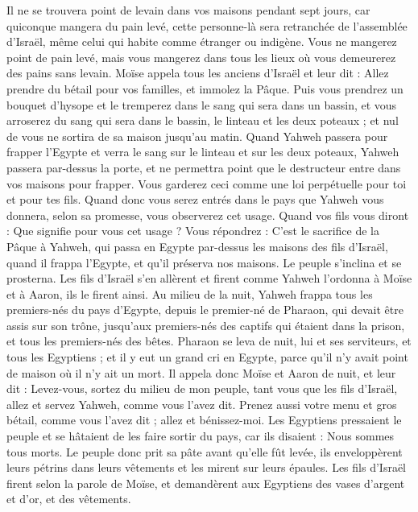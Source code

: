 \begin{multicols}{2}
Il ne se trouvera point de levain dans vos maisons pendant sept jours, car quiconque mangera du pain levé, cette personne-là sera retranchée de l’assemblée d'Israël, même celui qui habite comme étranger ou indigène.
Vous ne mangerez point de pain levé, mais vous mangerez dans tous les lieux où vous demeurerez des pains sans levain.
Moïse appela tous les anciens d'Israël et leur dit : Allez prendre du bétail pour vos familles, et immolez la Pâque.
Puis vous prendrez un bouquet d'hysope et le tremperez dans le sang qui sera dans un bassin, et vous arroserez du sang qui sera dans le bassin, le linteau et les deux poteaux ; et nul de vous ne sortira de sa maison jusqu'au matin.
Quand Yahweh passera pour frapper l'Egypte et verra le sang sur le linteau et sur les deux poteaux, Yahweh passera par-dessus la porte, et ne permettra point que le destructeur entre dans vos maisons pour frapper.
Vous garderez ceci comme une loi perpétuelle pour toi et pour tes fils.
Quand donc vous serez entrés dans le pays que Yahweh vous donnera, selon sa promesse, vous observerez cet usage.
Quand vos fils vous diront : Que signifie pour vous cet usage ?
Vous répondrez : C'est le sacrifice de la Pâque à Yahweh, qui passa en Egypte par-dessus les maisons des fils d'Israël, quand il frappa l'Egypte, et qu'il préserva nos maisons. Le peuple s'inclina et se prosterna.
Les fils d'Israël s'en allèrent et firent comme Yahweh l’ordonna à Moïse et à Aaron, ils le firent ainsi.
Au milieu de la nuit, Yahweh frappa tous les premiers-nés du pays d'Egypte, depuis le premier-né de Pharaon, qui devait être assis sur son trône, jusqu'aux premiers-nés des captifs qui étaient dans la prison, et tous les premiers-nés des bêtes.
Pharaon se leva de nuit, lui et ses serviteurs, et tous les Egyptiens ; et il y eut un grand cri en Egypte, parce qu'il n'y avait point de maison où il n'y ait un mort\FTNT{}.
Il appela donc Moïse et Aaron de nuit, et leur dit : Levez-vous, sortez du milieu de mon peuple, tant vous que les fils d'Israël, allez et servez Yahweh, comme vous l’avez dit.
Prenez aussi votre menu et gros bétail, comme vous l’avez dit ; allez et bénissez-moi.
Les Egyptiens pressaient le peuple et se hâtaient de les faire sortir du pays, car ils disaient : Nous sommes tous morts.
Le peuple donc prit sa pâte avant qu'elle fût levée, ils enveloppèrent leurs pétrins dans leurs vêtements et les mirent sur leurs épaules.
Les fils d'Israël firent selon la parole de Moïse, et demandèrent aux Egyptiens des vases d'argent et d'or, et des vêtements.

\end{multicols}
